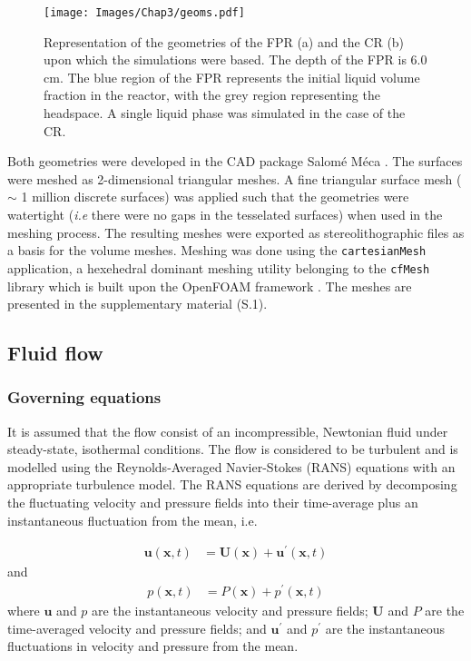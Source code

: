  \begin{figure}[H]
\centering
\texttt{[image: Images/Chap3/geoms.pdf]}
\caption{Representation of the geometries of the FPR (a) and the CR (b) upon which the simulations were based. The depth of the FPR is 6.0 cm. The blue region of the FPR represents the initial liquid volume fraction in the reactor, with the grey region representing the headspace. A single liquid phase was simulated in the case of the CR.}
\label{fig:geoms}
\end{figure}

Both geometries were developed in the CAD package Salom\'{e} M\'{e}ca \cite{electricitedefrance1989}. The surfaces were meshed as 2-dimensional triangular meshes. A fine triangular surface mesh ($\mathtt{\sim}$ 1 million discrete surfaces) was applied such that the geometries were watertight (\emph{i.e} there were no gaps in the tesselated surfaces) when used in the meshing process. The resulting meshes were exported as stereolithographic files as a basis for the volume meshes. Meshing was done using the \texttt{cartesianMesh} application, a hexehedral dominant meshing utility belonging to the \texttt{cfMesh} library \cite{creativefields2015} which is built upon the OpenFOAM framework \cite{theopenfoamfoundation2017}. The meshes are presented in the supplementary material (S.1).

\subsection{Fluid flow}
\label{ssec:flow}

\subsubsection{Governing equations}

It is assumed that the flow consist of an incompressible, Newtonian fluid under steady-state, isothermal conditions. The flow is considered to be turbulent and is modelled using the Reynolds-Averaged Navier-Stokes (RANS) equations with an appropriate turbulence model. The RANS equations are derived by decomposing the fluctuating velocity and pressure fields into their time-average plus an instantaneous fluctuation from the mean, i.e.

\begin{align}
\mathbf{u}(\mathbf{x}, t) &= \mathbf{U}(\mathbf{x}) + \mathbf{u}^\prime(\mathbf{x}, t)
\end{align}
%
and 
%
\begin{align}
p(\mathbf{x}, t) &= P(\mathbf{x}) + p^\prime(\mathbf{x}, t)
\end{align}
%
where $\mathbf{u}$ and $p$ are the instantaneous velocity and pressure fields; $\mathbf{U}$ and $P$ are the time-averaged velocity and pressure fields; and $\mathbf{u}^\prime$ and $p^\prime$ are the instantaneous fluctuations in velocity and pressure from the mean.

